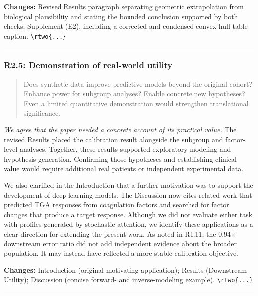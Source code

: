 \documentclass[
  11pt,
  letterpaper,
]{article}
\begin{document}
\textbf{Changes:} Revised Results paragraph separating geometric extrapolation from biological plausibility and stating the bounded conclusion supported by both checks; Supplement (E2), including a corrected and condensed convex-hull table caption. \texttt{\textbackslash{}rtwo\{...\}}

\begin{center}\rule{0.5\linewidth}{0.5pt}\end{center}

\subsubsection{R2.5: Demonstration of real-world utility}\label{r25-demonstration-of-real-world-utility}

\begin{quote}
Does synthetic data improve predictive models beyond the original cohort? Enhance power for subgroup analyses? Enable concrete new hypotheses? Even a limited quantitative demonstration would strengthen translational significance.
\end{quote}

\emph{We agree that the paper needed a concrete account of its practical value.} The revised Results placed the calibration result alongside the subgroup and factor-level analyses. Together, these results supported exploratory modeling and hypothesis generation. Confirming those hypotheses and establishing clinical value would require additional real patients or independent experimental data.

We also clarified in the Introduction that a further motivation was to support the development of deep learning models. The Discussion now cites related work that predicted TGA responses from coagulation factors and searched for factor changes that produce a target response. Although we did not evaluate either task with profiles generated by stochastic attention, we identify these applications as a clear direction for extending the present work. As noted in R1.11, the 0.94× downstream error ratio did not add independent evidence about the broader population. It may instead have reflected a more stable calibration objective.

\textbf{Changes:} Introduction (original motivating application); Results (Downstream Utility); Discussion (concise forward- and inverse-modeling example). \texttt{\textbackslash{}rtwo\{...\}}

\begin{center}\rule{0.5\linewidth}{0.5pt}\end{center}
\end{document}
